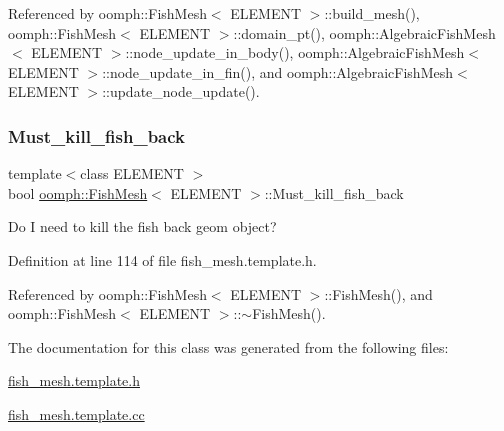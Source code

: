 Referenced by oomph\+::\+Fish\+Mesh$<$ E\+L\+E\+M\+E\+N\+T $>$\+::build\+\_\+mesh(), oomph\+::\+Fish\+Mesh$<$ E\+L\+E\+M\+E\+N\+T $>$\+::domain\+\_\+pt(), oomph\+::\+Algebraic\+Fish\+Mesh$<$ E\+L\+E\+M\+E\+N\+T $>$\+::node\+\_\+update\+\_\+in\+\_\+body(), oomph\+::\+Algebraic\+Fish\+Mesh$<$ E\+L\+E\+M\+E\+N\+T $>$\+::node\+\_\+update\+\_\+in\+\_\+fin(), and oomph\+::\+Algebraic\+Fish\+Mesh$<$ E\+L\+E\+M\+E\+N\+T $>$\+::update\+\_\+node\+\_\+update().

\mbox{\label{classoomph_1_1FishMesh_ad1dd5a431f711d3ac14498cc6ab4d856}} 
\subsubsection{\texorpdfstring{Must\+\_\+kill\+\_\+fish\+\_\+back}{Must\_kill\_fish\_back}}
{\footnotesize\ttfamily template$<$class E\+L\+E\+M\+E\+NT $>$ \\
bool \hyperlink{classoomph_1_1FishMesh}{oomph\+::\+Fish\+Mesh}$<$ E\+L\+E\+M\+E\+NT $>$\+::Must\+\_\+kill\+\_\+fish\+\_\+back\hspace{0.3cm}{\ttfamily [protected]}}



Do I need to kill the fish back geom object? 



Definition at line 114 of file fish\+\_\+mesh.\+template.\+h.



Referenced by oomph\+::\+Fish\+Mesh$<$ E\+L\+E\+M\+E\+N\+T $>$\+::\+Fish\+Mesh(), and oomph\+::\+Fish\+Mesh$<$ E\+L\+E\+M\+E\+N\+T $>$\+::$\sim$\+Fish\+Mesh().



The documentation for this class was generated from the following files\+:\begin{DoxyCompactItemize}
\item 
\hyperlink{fish__mesh_8template_8h}{fish\+\_\+mesh.\+template.\+h}\item 
\hyperlink{fish__mesh_8template_8cc}{fish\+\_\+mesh.\+template.\+cc}\end{DoxyCompactItemize}
